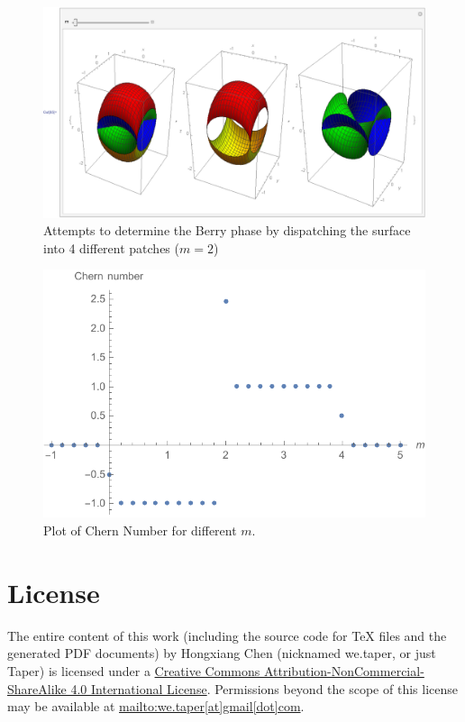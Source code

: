 \documentclass{article}
\begin{document}
    \begin{figure}[htpb]
        \centering
        \includegraphics[width=0.8\linewidth]{pics/BerryPhase/attempts.pdf}
        \caption{Attempts to determine the Berry phase by dispatching the surface
        into 4 different patches ($m=2$)}
        \label{fig:BerryPhase/attempts}
    \end{figure}
    \begin{figure}[htpb]
        \centering
        \includegraphics[width=0.8\linewidth]{pics/BerryPhase/SSQFormulaPlot.pdf}
        \caption{Plot of Chern Number for different $m$.}
        \label{fig:BerryPhase/SSQFormulaPlot}
    \end{figure}

\section{License}
The entire content of this work (including the source code
for TeX files and the generated PDF documents) by 
Hongxiang Chen (nicknamed we.taper, or just Taper) is
licensed under a 
\href{http://creativecommons.org/licenses/by-nc-sa/4.0/}{Creative 
Commons Attribution-NonCommercial-ShareAlike 4.0 International 
License}. Permissions beyond the scope of this 
license may be available at \url{mailto:we.taper[at]gmail[dot]com}.

{}

\printnomenclature
\end{document}
